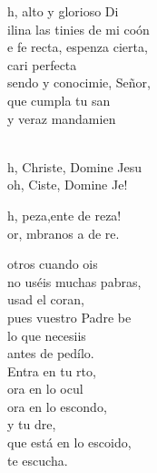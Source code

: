 \documentclass[12pt]{article}
\begin{document}
\begin{multicols*}{2}
\begin{cancion}%
	h, alto y glorioso Di\\
	ilina las tinies de mi coón\\
	e fe recta, espenza cierta,\\
	cari perfecta\\
	sendo y conocimie, Señor,\\
	 que cumpla tu san \\
	y veraz mandamien \\
\end{cancion}%

\begin{cancion}[Oh, Christe][Taizé]%
	  \\
	h, Christe, Domine Jesu\\
	oh, Ciste, Domine Je!\\
\end{cancion}%

\begin{cancion}[Oh, pobreza][Taizé]%
	h, peza,ente de reza!\\
	or, mbranos a de re.  \\
\end{cancion}%

\begin{cancion}%
	otros cuando ois \\
	no uséis muchas pabras,\\
	usad el coran,\\
	pues vuestro Padre be\\
	lo que necesiis \\
	antes de pedílo.\\
	Entra en tu rto,\\
	ora en lo ocul\\
	ora en lo escondo,\\
	y tu dre,\\
	que está en lo escoido,\\
	te escucha.\\
\end{cancion}%


\end{multicols*}
\end{document}
